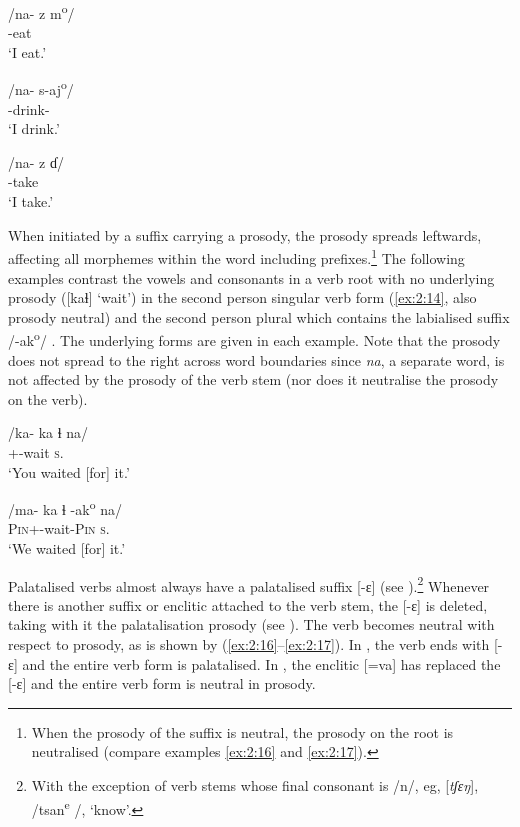 \ea \label{ex:2:11}
\gll {[nɔ-zɔm]}   \hspace{10pt}   /na-  z m\textsuperscript{o}/\\
      {\oneS}-eat\\
\glt  ‘I eat.’
\z

\ea \label{ex:2:12}
\gll {[nɛ-ʃ-ɛ]}  /na-  s-aj\textsuperscript{o}/\\
      {\oneS}-drink-{\CL}\\
\glt  ‘I drink.’
\z

\ea \label{ex:2:13}
\gll {[na-zaɗ]}  \hspace{10pt}    /na-  z ɗ/\\
      {\oneS}-take\\
\glt  ‘I take.’
\z

\largerpage
When initiated by a suffix carrying a prosody, the prosody spreads leftwards, affecting all morphemes within the word including prefixes.\footnote{When the prosody of the suffix is neutral, the prosody on the root is neutralised (compare examples \ref{ex:2:16} and \ref{ex:2:17}).} The following examples contrast the vowels and consonants in a verb root with no underlying prosody ([kaɬ] ‘wait’) in the second person singular verb form (\ref{ex:2:14}, also prosody neutral) and the second person plural which contains the labialised suffix /-ak\textsuperscript{o}/ . The underlying forms are given in each example. Note that the prosody does not spread to the right across word boundaries since \textit{na}, a separate word, is not affected by the prosody of the verb stem (nor does it neutralise the prosody on the verb).

\ea \label{ex:2:14}
\gll [kà-kaɬ na] {\hspace{60pt}} /ka-  ka ɬ  na/\\
      {\twoS}+{\PFV}-wait    \textsc{s}.\DO\\
\glt  ‘You waited [for] it.'
\z

\ea \label{ex:2:15}
 /ma-  ka ɬ  -ak\textsuperscript{o} na/\\
      \textsc{Pin}+\PFV-wait-\textsc{Pin}  \textsc{s}.\DO\\
\glt  ‘We waited [for] it.'
\z

Palatalised verbs almost always have a palatalised suffix [{}-ɛ] (see ).\footnote{With the exception of verb stems whose final consonant is /n/, eg, [\textit{tʃɛŋ}], /tsan\textsuperscript{e }/, ‘know’.}  Whenever there is another suffix or enclitic attached to the verb stem, the [-ɛ] is deleted, taking with it the palatalisation prosody (see ). The verb becomes neutral with respect to prosody, as is shown by (\ref{ex:2:16}--\ref{ex:2:17}). In , the verb ends with [{}-ɛ] and the entire verb form is palatalised. In , the enclitic [=va] has replaced the [{}-ɛ] and the entire verb form is neutral in prosody.


